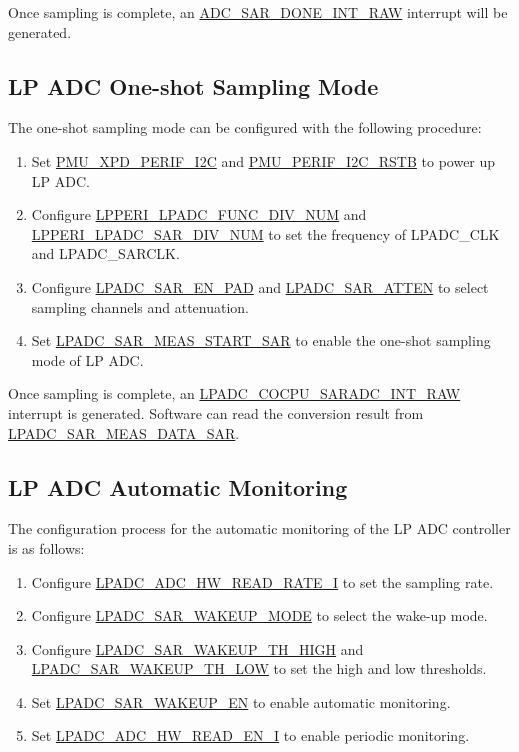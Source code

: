 \documentclass[main\_\_EN.tex]{subfiles}
\begin{document}
Once sampling is complete, an \hyperref[fielddesc:ADCSAR1DONEINTRAW]{ADC\_SAR\_DONE\_INT\_RAW} interrupt will be generated.

\subsection{LP ADC One-shot Sampling Mode}

The one-shot sampling mode can be configured with the following procedure:

\begin{enumerate}
    \item Set \hyperref[fielddesc:PMUXPDPERIFI2C]{PMU\_XPD\_PERIF\_I2C} and \hyperref[fielddesc:PMUPERIFI2CRSTB]{PMU\_PERIF\_I2C\_RSTB} to power up LP ADC.
    \item Configure \hyperref[fielddesc:LPPERILPADCFUNCDIVNUM]{LPPERI\_LPADC\_FUNC\_DIV\_NUM} and \hyperref[fielddesc:LPPERILPADCSAR1DIVNUM]{LPPERI\_LPADC\_SAR\_DIV\_NUM} to set the frequency of LPADC\_CLK and LPADC\_SARCLK.
    \item Configure \hyperref[fielddesc:LPADCSAR1ENPAD]{LPADC\_SAR\_EN\_PAD} and \hyperref[fielddesc:LPADCSAR1ATTEN]{LPADC\_SAR\_ATTEN} to select sampling channels and attenuation.
    \item Set \hyperref[fielddesc:LPADCMEAS1STARTSAR]{LPADC\_SAR\_MEAS\_START\_SAR} to enable the one-shot sampling mode of LP ADC.
\end{enumerate}

Once sampling is complete, an \hyperref[fielddesc:LPADCCOCPUSARADC1INTRAW]{LPADC\_COCPU\_SARADC\_INT\_RAW} interrupt is generated. Software can read the conversion result from \hyperref[fielddesc:LPADCMEAS1DATASAR]{LPADC\_SAR\_MEAS\_DATA\_SAR}.

\subsection{LP ADC Automatic Monitoring}

The configuration process for the automatic monitoring of the LP ADC controller is as follows:
\begin{enumerate}
        \item Configure \hyperref[fielddesc:LPADCADC1HWREADRATEI]{LPADC\_ADC\_HW\_READ\_RATE\_I} to set the sampling rate.
        \item Configure \hyperref[fielddesc:LPADCSAR1WAKEUPMODE]{LPADC\_SAR\_WAKEUP\_MODE} to select the wake-up mode.
        \item Configure \hyperref[fielddesc:LPADCSAR1WAKEUPTHHIGH]{LPADC\_SAR\_WAKEUP\_TH\_HIGH} and \hyperref[fielddesc:LPADCSAR1WAKEUPTHLOW]{LPADC\_SAR\_WAKEUP\_TH\_LOW} to set the high and low thresholds.
        \item Set \hyperref[fielddesc:LPADCSAR1WAKEUPEN]{LPADC\_SAR\_WAKEUP\_EN} to enable automatic monitoring.
        \item Set \hyperref[fielddesc:LPADCADC1HWREADENI]{LPADC\_ADC\_HW\_READ\_EN\_I} to enable periodic monitoring.
\end{enumerate}
\end{document}

